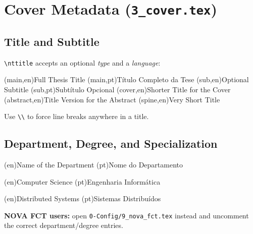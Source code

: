 \section{Cover Metadata (\texttt{3\_cover.tex})}
\label{sec:cover_metadata}

\subsection{Title and Subtitle}
\label{sub:title}

\verb!\nttitle! accepts an optional \emph{type} and a \emph{language}:
\begin{latexcode}
\nttitle(main,en){Full Thesis Title}
\nttitle(main,pt){Título Completo da Tese}
\nttitle(sub,en){Optional Subtitle}
\nttitle(sub,pt){Subtítulo Opcional}
\nttitle(cover,en){Shorter Title for the Cover}
\nttitle(abstract,en){Title Version for the Abstract}
\nttitle(spine,en){Very Short Title}
\end{latexcode}

Use \verb!\\! to force line breaks anywhere in a title.

\subsection{Department, Degree, and Specialization}
\label{sub:dept_degree}

\begin{latexcode}
\ntdepartment*(en){Name of the Department}
\ntdepartment*(pt){Nome do Departamento}

\ntdegreename*(en){Computer Science}
\ntdegreename*(pt){Engenharia Informática}

\ntspecialization*(en){Distributed Systems}    %
\ntspecialization*(pt){Sistemas Distribuídos}
\end{latexcode}

\textbf{NOVA FCT users:} open \verb!0-Config/9_nova_fct.tex! instead and
uncomment the correct department/degree entries.

